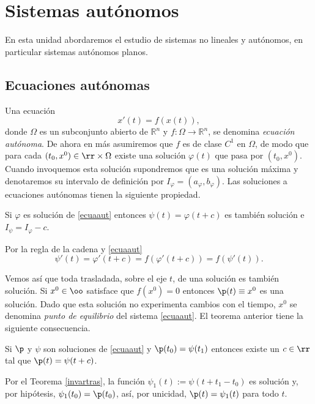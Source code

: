 \chapter{Sistemas autónomos}


En esta unidad abordaremos el estudio de  sistemas no lineales y
autónomos, en particular sistemas autónomos planos.
\section{Ecuaciones autónomas}

Una ecuación
\begin{equation}\label{ecuaaut}
    x'(t)=f(x(t)),
\end{equation}
donde $\Omega$ es un subconjunto abierto de $\mathbb{R}^n$ y $
f:\Omega\to\mathbb{R}^n$, se denomina \emph{ecuación autónoma}. De
ahora en más asumiremos que $f$ es de clase $C^1$ en $\Omega$, de
modo que para cada $(t_0,x^0)\in\rr\times\Omega$ existe una
solución $\varphi(t)$ que pasa por $(t_0,x^0)$. Cuando invoquemos
esta solución supondremos que es una solución máxima y denotaremos
su intervalo de definición por
$I_{\varphi}=(a_{\varphi},b_{\varphi})$. Las soluciones a
ecuaciones autónomas tienen la siguiente  propiedad.

\begin{teorema}\label{invartras} Si $\varphi$ es solución de \eqref{ecuaaut}
entonces $\psi(t)=\varphi(t+c)$ es también solución e
$I_{\psi}=I_{\varphi}-c$.
\end{teorema}
\begin{demo} Por la regla de la cadena y \eqref{ecuaaut}
\[
    \psi'(t)=\varphi'(t+c)=f(\varphi'(t+c))=f(\psi'(t)).
\]
\end{demo}
Vemos así que toda trasladada, sobre el eje $t$, de una solución
es también solución. Si $x^0\in\oo$ satisface que $f(x^0)=0$
entonces $\p(t)\equiv x^0$ es una solución. Dado que esta solución
no experimenta cambios con el tiempo, $x^0$ se denomina
\emph{punto de equilibrio} del sistema \eqref{ecuaaut}. El teorema
anterior tiene la siguiente consecuencia.

\begin{teorema}\label{orbitasnoencuentran} Si $\p$ y $\psi$ son soluciones de
\eqref{ecuaaut} y $\p(t_0)=\psi(t_1)$ entonces existe un $c\in\rr$
tal que $\p(t)=\psi(t+c)$.
\end{teorema}
\begin{demo} Por el Teorema \ref{invartras}, la función
$\psi_1(t):=\psi(t+t_1-t_0)$ es solución y, por hipótesis,
$\psi_1(t_0)=\p(t_0)$, así, por unicidad, $\p(t)=\psi_1(t)$ para
todo $t$. \end{demo}


